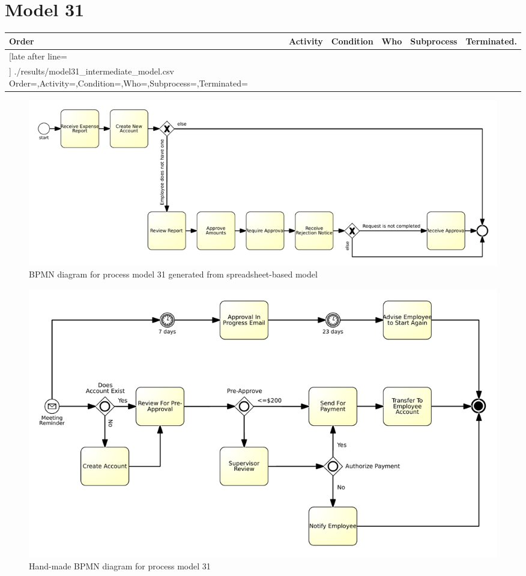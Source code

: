\section{Model 31}
\begin{tcolorbox}[
	breakable,
	arc=0mm,
	left=1pt,
	right = 1pt,
	boxrule=0mm,
	colback = {white},
	]
	\texttt{}
\end{tcolorbox}
\label{txt:model31}

{\scriptsize
	\begin{longtable}{|p{0.03 \hsize}|p{0.25 \hsize}|p{0.15 \hsize}|p{0.2 \hsize}|p{0.1 \hsize}|p{0.1 \hsize}|}
		\hline
		Order & Activity & Condition & Who & Subprocess & Terminated.
		\\\hline\hline
		\csvreader[late after line=\\\hline]
		{./results/model31_intermediate_model.csv}
		{Order=\Order,Activity=\Activity,Condition=\Condition,Who=\Who,Subprocess=\Subprocess,Terminated=\Terminated}
		{\Order & \Activity & \Condition & \Who & \Subprocess & \Terminated}
		\caption{Spreadsheet-based description for process model 31}
		\label{csv:model31}
	\end{longtable}
}

\begin{figure}[H]
	\centering
	\includegraphics[width=\hsize]{./generated_bpmn/model31.pdf}
	\caption{BPMN diagram for process model 31 generated from spreadsheet-based model}
	\label{bpmn:generated_model31}
\end{figure}

\begin{figure}[H]
	\centering
	\includegraphics[width=\hsize]{./bpmn/model31.pdf}
	\caption{Hand-made BPMN diagram for process model 31}
	\label{bpmn:model31}
\end{figure}

